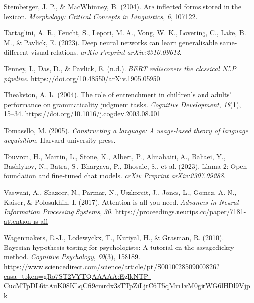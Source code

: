 \documentclass[
  12pt,
  letterpaper,
]{scrreport}
\newlength{\cslhangindent}
\newenvironment{CSLReferences}[2] %
 {\begin{list}{}{%
  \setlength{\itemindent}{0pt}
  \setlength{\leftmargin}{0pt}
  \setlength{\parsep}{0pt}
  \ifodd #1
   \setlength{\leftmargin}{\cslhangindent}
   \setlength{\itemindent}{-1\cslhangindent}
  \fi
  \setlength{\itemsep}{#2\baselineskip}}}
 {\end{list}}
\begin{document}
\begin{CSLReferences}{1}{0}
Stemberger, J. P., \& MacWhinney, B. (2004). Are inflected forms stored
in the lexicon. \emph{Morphology: Critical Concepts in Linguistics},
\emph{6}, 107122.

Tartaglini, A. R., Feucht, S., Lepori, M. A., Vong, W. K., Lovering, C.,
Lake, B. M., \& Pavlick, E. (2023). Deep neural networks can learn
generalizable same-different visual relations. \emph{arXiv Preprint
arXiv:2310.09612}.

Tenney, I., Das, D., \& Pavlick, E. (n.d.). \emph{BERT rediscovers the
classical NLP pipeline}. \url{https://doi.org/10.48550/arXiv.1905.05950}

Theakston, A. L. (2004). The role of entrenchment in children{'}s and
adults{'} performance on grammaticality judgment tasks. \emph{Cognitive
Development}, \emph{19}(1), 15--34.
\url{https://doi.org/10.1016/j.cogdev.2003.08.001}

Tomasello, M. (2005). \emph{Constructing a language: A usage-based
theory of language acquisition}. Harvard university press.

Touvron, H., Martin, L., Stone, K., Albert, P., Almahairi, A., Babaei,
Y., Bashlykov, N., Batra, S., Bhargava, P., Bhosale, S., et al. (2023).
Llama 2: Open foundation and fine-tuned chat models. \emph{arXiv
Preprint arXiv:2307.09288}.

Vaswani, A., Shazeer, N., Parmar, N., Uszkoreit, J., Jones, L., Gomez,
A. N., Kaiser, \& Polosukhin, I. (2017). Attention is all you need.
\emph{Advances in Neural Information Processing Systems}, \emph{30}.
\url{https://proceedings.neurips.cc/paper/7181-attention-is-all}

Wagenmakers, E.-J., Lodewyckx, T., Kuriyal, H., \& Grasman, R. (2010).
Bayesian hypothesis testing for psychologists: A tutorial on the
savage{\textendash}dickey method. \emph{Cognitive Psychology},
\emph{60}(3), 158189.
\url{https://www.sciencedirect.com/science/article/pii/S0010028509000826?casa_token=gRo7ST2VYTQAAAAA:EgIkNTP-CucMTpDL6ttAuK08KLqCfi9cmrdx3sTTpZiLjrC6T5qMm1vM0girWG6lHDl9Vjpk}


\end{CSLReferences}
\end{document}
